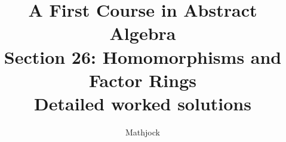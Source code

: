 
\title{\textbf{A First Course in Abstract Algebra}\\[0.3em]Section 26: Homomorphisms and Factor Rings\\[0.3em]\large Detailed worked solutions}
\author{Mathjock}
\date{}

\maketitle
\bookinfo
\tableofcontents
\clearpage
\renewcommand{\thesection}{26}
\renewcommand{\theHsection}{fraleigh.26}


